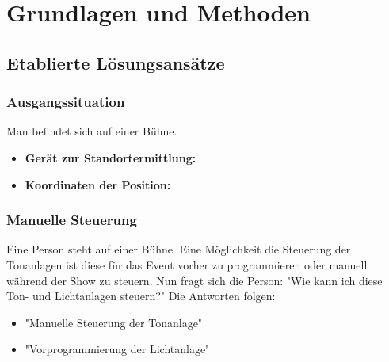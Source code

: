 
\pagestyle{fancy} \frenchspacing
\renewcommand{\chaptermark}[1]{\markboth{#1}{}}

\renewcommand{\textfraction}{0}
\renewcommand{\floatpagefraction}{0.999}
\renewcommand{\topfraction}{0.7}
\renewcommand{\bottomfraction}{0.999}
\lfoot{}


\fancyhf{} %





\chapter{Grundlagen und Methoden}

\section{Etablierte Lösungsansätze}

\subsection{Ausgangssituation}

Man befindet sich auf einer Bühne. 
\begin{itemize}
	\item \textbf{Gerät zur Standortermittlung: } 
	\item \textbf{Koordinaten der Position: }
\end{itemize}

\subsection{Manuelle Steuerung}
Eine Person steht auf einer Bühne. Eine Möglichkeit die Steuerung der Tonanlagen ist diese für das Event vorher zu programmieren oder manuell während der Show zu steuern. Nun fragt sich die Person: "Wie kann ich diese Ton- und Lichtanlagen steuern?" Die Antworten folgen:

\begin{itemize}
	\item "Manuelle Steuerung der Tonanlage"
	\item "Vorprogrammierung der Lichtanlage"
\end{itemize}


